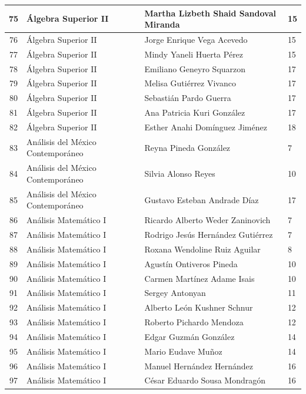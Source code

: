 {\begin{longtable}{|c|p{6.5cm}|p{5cm}|p{1.5cm}|}
  75 & Álgebra Superior II & Martha Lizbeth Shaid Sandoval Miranda & 15 \\ \hline
  76 & Álgebra Superior II & Jorge Enrique Vega Acevedo & 15 \\ \hline
  77 & Álgebra Superior II & Mindy Yaneli Huerta Pérez & 15 \\ \hline
  78 & Álgebra Superior II & Emiliano Geneyro Squarzon & 17 \\ \hline
  79 & Álgebra Superior II & Melisa Gutiérrez Vivanco & 17 \\ \hline
  80 & Álgebra Superior II & Sebastián Pardo Guerra & 17 \\ \hline
  81 & Álgebra Superior II & Ana Patricia Kuri González & 17 \\ \hline
  82 & Álgebra Superior II & Esther Anahi Domínguez Jiménez & 18 \\ \hline
  83 & Análisis del México Contemporáneo & Reyna Pineda González & 7 \\ \hline
  84 & Análisis del México Contemporáneo & Silvia Alonso Reyes & 10 \\ \hline
  85 & Análisis del México Contemporáneo & Gustavo Esteban Andrade Díaz & 17 \\ \hline
  86 & Análisis Matemático I & Ricardo Alberto Weder Zaninovich & 7 \\ \hline
  87 & Análisis Matemático I & Rodrigo Jesús Hernández Gutiérrez & 7 \\ \hline
  88 & Análisis Matemático I & Roxana Wendoline Ruiz Aguilar & 8 \\ \hline
  89 & Análisis Matemático I & Agustín Ontiveros Pineda & 10 \\ \hline
  90 & Análisis Matemático I & Carmen Martínez Adame Isais & 10 \\ \hline
  91 & Análisis Matemático I & Sergey Antonyan & 11 \\ \hline
  92 & Análisis Matemático I & Alberto León Kushner Schnur & 12 \\ \hline
  93 & Análisis Matemático I & Roberto Pichardo Mendoza & 12 \\ \hline
  94 & Análisis Matemático I & Edgar Guzmán González & 14 \\ \hline
  95 & Análisis Matemático I & Mario Eudave Muñoz & 14 \\ \hline
  96 & Análisis Matemático I & Manuel Hernández Hernández & 16 \\ \hline
  97 & Análisis Matemático I & César Eduardo Sousa Mondragón & 16 \\ \hline

\end{longtable}}
